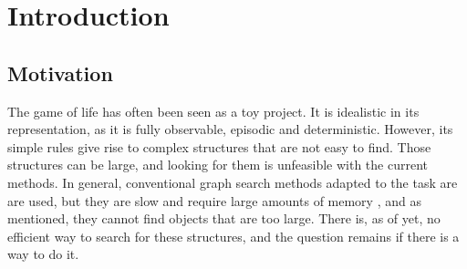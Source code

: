 \documentclass{l4proj}
\begin{document}
%
%
%
%
%
%
%
%
\chapter{Introduction}


\section{Motivation}

The game of life has often been seen as a toy project. It is idealistic in its representation, as it is fully observable, episodic and deterministic. However, its simple rules give rise to complex structures that are not easy to find. Those structures can be large, and looking for them is unfeasible with the current methods. In general, conventional graph search methods adapted to the task are are used, but they are slow and require large amounts of memory \cite{list_of_search_algorithms}, and as mentioned, they cannot find objects that are too large. There is, as of yet, no efficient way to search for these structures, and the question remains if there is a way to do it.
\end{document}
